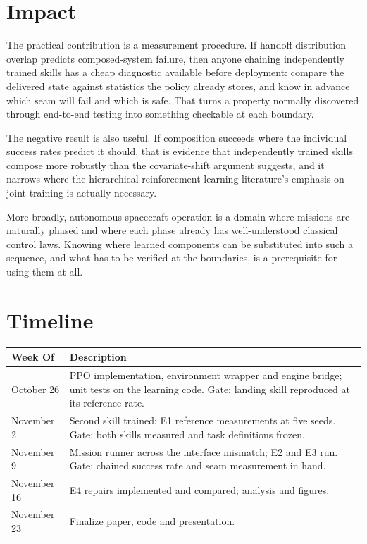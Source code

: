 \documentclass[11pt]{article}
\begin{document}
\section{Impact}

The practical contribution is a measurement procedure. If handoff distribution overlap
predicts composed-system failure, then anyone chaining independently trained skills has
a cheap diagnostic available before deployment: compare the delivered state against
statistics the policy already stores, and know in advance which seam will fail and
which is safe. That turns a property normally discovered through end-to-end testing
into something checkable at each boundary.

The negative result is also useful. If composition succeeds where the individual
success rates predict it should, that is evidence that independently trained skills
compose more robustly than the covariate-shift argument suggests, and it narrows where
the hierarchical reinforcement learning literature's emphasis on joint training is
actually necessary.

More broadly, autonomous spacecraft operation is a domain where missions are naturally
phased and where each phase already has well-understood classical control laws. Knowing
where learned components can be substituted into such a sequence, and what has to be
verified at the boundaries, is a prerequisite for using them at all.

\section{Timeline}

\begin{table}[h]
\centering
\begin{tabular}{|l|p{10.2cm}|}
\hline
\textbf{Week Of} & \textbf{Description} \\
\hline
October 26 & PPO implementation, environment wrapper and engine bridge; unit tests on the learning code. Gate: landing skill reproduced at its reference rate. \\
\hline
November 2 & Second skill trained; E1 reference measurements at five seeds. Gate: both skills measured and task definitions frozen. \\
\hline
November 9 & Mission runner across the interface mismatch; E2 and E3 run. Gate: chained success rate and seam measurement in hand. \\
\hline
November 16 & E4 repairs implemented and compared; analysis and figures. \\
\hline
November 23 & Finalize paper, code and presentation. \\
\hline
\end{tabular}
\end{table}
\end{document}
